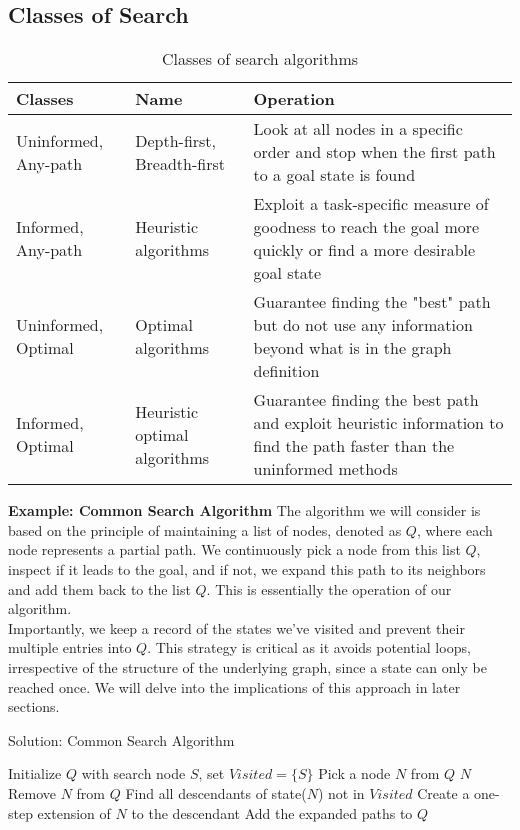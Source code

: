 \documentclass[a4paper,UKenglish,cleveref, autoref, thm-restate]{qlinhta}
\begin{document}
\subsection{Classes of Search}
\begin{table}[h]
\centering
\begin{tabular}{|p{4cm}|p{4cm}|p{6cm}|}
\hline
\textbf{Classes} & \textbf{Name} & \textbf{Operation} \\
\hline
Uninformed, Any-path & Depth-first, Breadth-first & Look at all nodes in a specific order and stop when the first path to a goal state is found \\
\hline
Informed, Any-path & Heuristic algorithms & Exploit a task-specific measure of goodness to reach the goal more quickly or find a more desirable goal state \\
\hline
Uninformed, Optimal & Optimal algorithms & Guarantee finding the "best" path but do not use any information beyond what is in the graph definition \\
\hline
Informed, Optimal & Heuristic optimal algorithms & Guarantee finding the best path and exploit heuristic information to find the path faster than the uninformed methods \\
\hline
\end{tabular}
\caption{Classes of search algorithms}
\label{tab:search_classes}
\end{table}

\textbf{Example: Common Search Algorithm} The algorithm we will consider is based on the principle of maintaining a list of nodes, denoted as $Q$, where each node represents a partial path. We continuously pick a node from this list $Q$, inspect if it leads to the goal, and if not, we expand this path to its neighbors and add them back to the list $Q$. This is essentially the operation of our algorithm.\\

Importantly, we keep a record of the states we've visited and prevent their multiple entries into $Q$. This strategy is critical as it avoids potential loops, irrespective of the structure of the underlying graph, since a state can only be reached once. We will delve into the implications of this approach in later sections. \\

\begin{algorithm}
\caption{Solution: Common Search Algorithm}
\begin{algorithmic}[1]
\State Initialize $Q$ with search node $S$, set $Visited = \{S\}$
    \State Pick a node $N$ from $Q$
        \State \Return $N$ 
    \EndIf
    \State Remove $N$ from $Q$
    \State Find all descendants of state($N$) not in $Visited$
        \State Create a one-step extension of $N$ to the descendant
    \EndFor
    \State Add the expanded paths to $Q$
\EndWhile
\end{algorithmic}
\end{algorithm}
\end{document}
